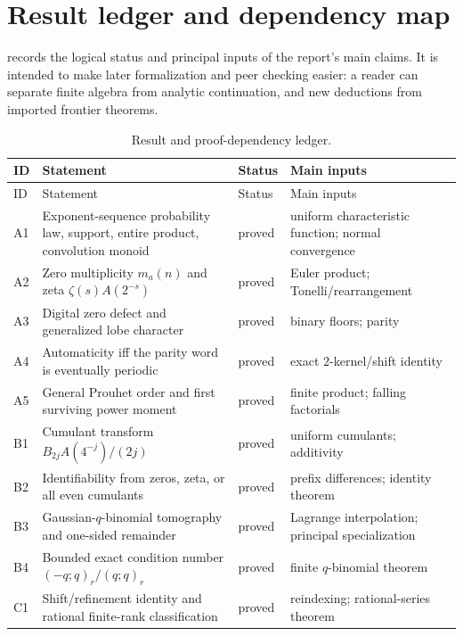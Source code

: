 \documentclass[11pt,oneside]{article}
\numberwithin{equation}{section}
\theoremstyle{definition}
\theoremstyle{remark}
\begin{document}
\section{Result ledger and dependency map}
\label{app:ledger}

 records the logical status and principal inputs of the report's main
claims.  It is intended to make later formalization and peer checking easier: a reader can
separate finite algebra from analytic continuation, and new deductions from imported
frontier theorems.

\begin{longtable}{@{}>{\raggedright\arraybackslash}p{}>{\raggedright\arraybackslash}p{}>{\raggedright\arraybackslash}p{}>{\raggedright\arraybackslash}p{}@{}}
\caption{Result and proof-dependency ledger.}
\label{tab:result-ledger}\\
\toprule
ID & Statement & Status & Main inputs\\
\midrule
\endfirsthead
\toprule
ID & Statement & Status & Main inputs\\
\midrule
\endhead
A1 & Exponent-sequence probability law, support, entire product, convolution monoid & proved & uniform characteristic function; normal convergence\\
A2 & Zero multiplicity $m_a(n)$ and zeta $\zeta(s)A(2^{-s})$ & proved & Euler product; Tonelli/rearrangement\\
A3 & Digital zero defect and generalized lobe character & proved & binary floors; parity\\
A4 & Automaticity iff the parity word is eventually periodic & proved & exact $2$-kernel/shift identity\\
A5 & General Prouhet order and first surviving power moment & proved & finite product; falling factorials\\
B1 & Cumulant transform $B_{2j}A(4^{-j})/(2j)$ & proved & uniform cumulants; additivity\\
B2 & Identifiability from zeros, zeta, or all even cumulants & proved & prefix differences; identity theorem\\
B3 & Gaussian-$q$-binomial tomography and one-sided remainder & proved & Lagrange interpolation; principal specialization\\
B4 & Bounded exact condition number $(-q;q)_r/(q;q)_r$ & proved & finite $q$-binomial theorem\\
C1 & Shift/refinement identity and rational finite-rank classification & proved & reindexing; rational-series theorem\\

\end{longtable}
\end{document}
